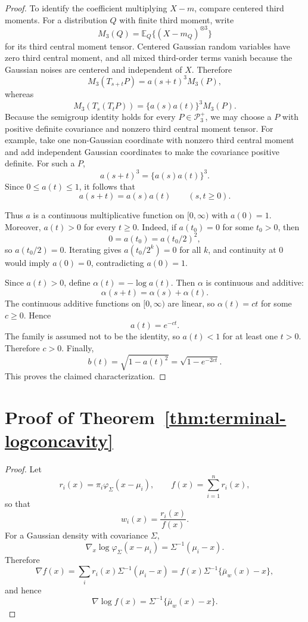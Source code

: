 \documentclass[preprint]{imsart}
\theoremstyle{plain}
\theoremstyle{definition}
\newcommand{\E}{\mathbb{E}}
\begin{document}
\begin{appendix}
\begin{proof}
To identify the coefficient multiplying \(X-m\), compare centered third
moments. For a distribution \(Q\) with finite third moment, write
\[
  M_3(Q)=\E_Q\{(X-m_Q)^{\otimes 3}\}
\]
for its third central moment tensor. Centered Gaussian random variables
have zero third central moment, and all mixed third-order terms vanish
because the Gaussian noises are centered and independent of \(X\).
Therefore
\[
  M_3(T_{s+t}P)=a(s+t)^3 M_3(P),
\]
whereas
\[
  M_3(T_s(T_tP))=\{a(s)a(t)\}^3M_3(P).
\]
Because the semigroup identity holds for every \(P\in\mathcal P_3^+\), we
may choose a \(P\) with positive definite covariance and nonzero third
central moment tensor. For example, take one non-Gaussian coordinate with
nonzero third central moment and add independent Gaussian coordinates to
make the covariance positive definite. For such a \(P\),
\[
  a(s+t)^3=\{a(s)a(t)\}^3.
\]
Since \(0\le a(t)\le1\), it follows that
\[
  a(s+t)=a(s)a(t)
  \qquad (s,t\ge0).
\]

Thus \(a\) is a continuous multiplicative function on \([0,\infty)\) with
\(a(0)=1\). Moreover, \(a(t)>0\) for every \(t\ge0\). Indeed, if
\(a(t_0)=0\) for some \(t_0>0\), then
\[
  0=a(t_0)=a(t_0/2)^2,
\]
so \(a(t_0/2)=0\). Iterating gives \(a(t_0/2^k)=0\) for all \(k\), and
continuity at \(0\) would imply \(a(0)=0\), contradicting \(a(0)=1\).

Since \(a(t)>0\), define $\alpha(t)=-\log a(t).$ Then \(\alpha\) is continuous and additive:
\[
  \alpha(s+t)=\alpha(s)+\alpha(t).
\]
The continuous additive functions on \([0,\infty)\) are linear, so $
  \alpha(t)=ct$
for some \(c\ge0\). Hence
\[
  a(t)=e^{-ct}.
\]
The family is assumed not to be the identity, so \(a(t)<1\) for at least
one \(t>0\). Therefore \(c>0\). Finally,
\[
  b(t)=\sqrt{1-a(t)^2}=\sqrt{1-e^{-2ct}}.
\]
This proves the claimed characterization.
\end{proof}


\section{Proof of Theorem~\ref{thm:terminal-logconcavity}}\label{app:proof3}
\begin{proof}
Let
\[
  r_i(x)=\pi_i\varphi_\Sigma(x-\mu_i),
  \qquad
  f(x)=\sum_{i=1}^n r_i(x),
\]
so that
\[
  w_i(x)=\frac{r_i(x)}{f(x)}.
\]
For a Gaussian density with covariance \(\Sigma\),
\[
  \nabla_x \log \varphi_\Sigma(x-\mu_i)
  =
  \Sigma^{-1}(\mu_i-x).
\]
Therefore
\[
  \nabla f(x)
  =
  \sum_i r_i(x)\Sigma^{-1}(\mu_i-x)
  =
  f(x)\Sigma^{-1}\{\bar\mu_w(x)-x\},
\]
and hence
\[
  \nabla\log f(x)
  =
  \Sigma^{-1}\{\bar\mu_w(x)-x\}.
\]


\end{proof}
\end{appendix}
\end{document}
